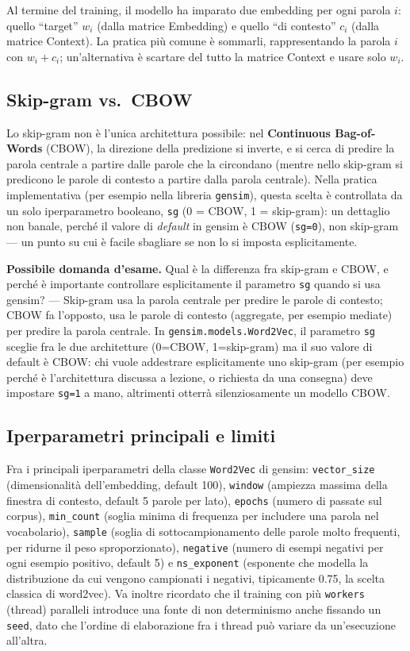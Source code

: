 \documentclass[11pt,a4paper]{report}
\newcommand{\domandaesame}[1]{\begin{esame}\textbf{Possibile domanda d'esame.} #1\end{esame}}
\begin{document}
Al termine del training, il modello ha imparato due embedding per ogni parola $i$: quello ``target'' $w_i$ (dalla matrice Embedding) e quello ``di contesto'' $c_i$ (dalla matrice Context). La pratica più comune è sommarli, rappresentando la parola $i$ con $w_i+c_i$; un'alternativa è scartare del tutto la matrice Context e usare solo $w_i$.

\subsection{Skip-gram vs.\ CBOW}

Lo skip-gram non è l'unica architettura possibile: nel \textbf{Continuous Bag-of-Words} (CBOW), la direzione della predizione si inverte, e si cerca di predire la parola centrale a partire dalle parole che la circondano (mentre nello skip-gram si predicono le parole di contesto a partire dalla parola centrale). Nella pratica implementativa (per esempio nella libreria \texttt{gensim}), questa scelta è controllata da un solo iperparametro booleano, \texttt{sg} (0 = CBOW, 1 = skip-gram): un dettaglio non banale, perché il valore di \emph{default} in gensim è CBOW (\texttt{sg=0}), non skip-gram --- un punto su cui è facile sbagliare se non lo si imposta esplicitamente.

\domandaesame{Qual è la differenza fra skip-gram e CBOW, e perché è importante controllare esplicitamente il parametro \texttt{sg} quando si usa gensim? --- Skip-gram usa la parola centrale per predire le parole di contesto; CBOW fa l'opposto, usa le parole di contesto (aggregate, per esempio mediate) per predire la parola centrale. In \texttt{gensim.models.Word2Vec}, il parametro \texttt{sg} sceglie fra le due architetture (0=CBOW, 1=skip-gram) ma il suo valore di default è CBOW: chi vuole addestrare esplicitamente uno skip-gram (per esempio perché è l'architettura discussa a lezione, o richiesta da una consegna) deve impostare \texttt{sg=1} a mano, altrimenti otterrà silenziosamente un modello CBOW.}

\subsection{Iperparametri principali e limiti}

Fra i principali iperparametri della classe \texttt{Word2Vec} di gensim: \texttt{vector\_size} (dimensionalità dell'embedding, default 100), \texttt{window} (ampiezza massima della finestra di contesto, default 5 parole per lato), \texttt{epochs} (numero di passate sul corpus), \texttt{min\_count} (soglia minima di frequenza per includere una parola nel vocabolario), \texttt{sample} (soglia di sottocampionamento delle parole molto frequenti, per ridurne il peso sproporzionato), \texttt{negative} (numero di esempi negativi per ogni esempio positivo, default 5) e \texttt{ns\_exponent} (esponente che modella la distribuzione da cui vengono campionati i negativi, tipicamente 0.75, la scelta classica di word2vec). Va inoltre ricordato che il training con più \texttt{workers} (thread) paralleli introduce una fonte di non determinismo anche fissando un \texttt{seed}, dato che l'ordine di elaborazione fra i thread può variare da un'esecuzione all'altra.
\end{document}

